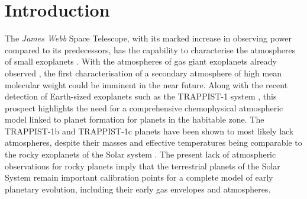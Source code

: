 \documentclass[bibyear,tradiabstract]{aa}
\begin{document}

   \maketitle
%

\section{Introduction}
The \textit{James Webb} Space Telescope, with its marked increase in observing power compared to its predecessors, has the capability to characterise the atmospheres of small exoplanets \citep{Rotman+2023}. With the atmospheres of gas giant exoplanets already observed \citep{Constantinou+2023}, the first characterisation of a secondary atmosphere of high mean molecular weight could be imminent in the near future. Along with the recent detection of Earth-sized exoplanets such as the TRAPPIST-1 system \citep{Gillon+2017}, this prospect highlights the need for a comprehensive chemophysical atmospheric model linked to planet formation for planets in the habitable zone. The TRAPPIST-1b and TRAPPIST-1c planets have been shown to most likely lack atmospheres, despite their masses and effective temperatures being comparable to the rocky exoplanets of the Solar system \citep{Greene+2023,Zieba+2023}. The present lack of atmospheric observations for rocky planets imply that the terrestrial planets of the Solar System remain important calibration points for a complete model of early planetary evolution, including their early gas envelopes and atmospheres.\\
\\
\end{document}
